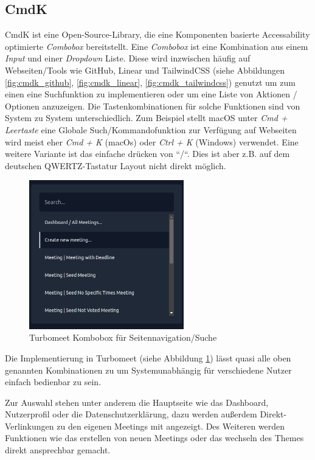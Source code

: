\subsection{CmdK}

CmdK ist eine Open-Source-Library, die eine Komponenten basierte Accessability optimierte \textit{Combobox} bereitstellt. Eine \textit{Combobox} ist eine Kombination aus einem \textit{Input} und einer \textit{Dropdown} Liste. Diese wird inzwischen häufig auf Webseiten/Tools wie GitHub, Linear und TailwindCSS (siehe Abbildungen \ref{fig:cmdk_github}, \ref{fig:cmdk_linear}, \ref{fig:cmdk_tailwindcss}) genutzt um zum einen eine Suchfunktion zu implementieren oder um eine Liste von Aktionen / Optionen anzuzeigen. Die Tastenkombinationen für solche Funktionen sind von System zu System unterschiedlich. Zum Beispiel stellt macOS unter \emph{Cmd + Leertaste} eine Globale Such/Kommandofunktion zur Verfügung auf Webseiten wird meist eher \emph{Cmd + K} (macOs) oder \emph{Ctrl + K} (Windows) verwendet. Eine weitere Variante ist das einfache drücken von ``/``. Dies ist aber z.B. auf dem deutschen QWERTZ-Tastatur Layout nicht direkt möglich.

\begin{figure}[th]
    \centering
    \includegraphics[width=0.6\textwidth]{Figures/turbomeet_cmdk.png}
    \decoRule
    \caption[Turbomeet Kombobox]{Turbomeet Kombobox für Seitennavigation/Suche}
    \label{fig:turbomeet_cmdk}
\end{figure}

Die Implementierung in Turbomeet (siehe Abbildung \ref{fig:turbomeet_cmdk}) lässt quasi alle oben genannten Kombinationen zu um Systemunabhängig für verschiedene Nutzer einfach bedienbar zu sein.

Zur Auswahl stehen unter anderem die Hauptseite wie das Dashboard, Nutzerprofil oder die Datenschutzerklärung, dazu werden außerdem Direkt-Verlinkungen zu den eigenen Meetings mit angezeigt. Des Weiteren werden Funktionen wie das erstellen von neuen Meetings oder das wechseln des Themes direkt ansprechbar gemacht.

